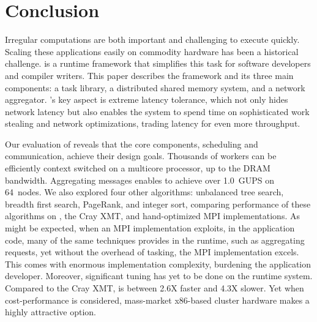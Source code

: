 \section{Conclusion}

Irregular computations are both important and challenging to execute
quickly.  Scaling these applications easily on commodity hardware has
been a historical challenge. \Grappa is a runtime framework that
simplifies this task for software developers and compiler
writers. This paper describes the \Grappa framework and its three main
components: a task library, a distributed shared memory system, and a
network aggregator. \Grappa's key aspect is extreme latency tolerance,
which not only hides network latency but also enables the system to
spend time on sophisticated work stealing and network optimizations,
trading latency for even more throughput.

Our evaluation of \Grappa reveals that the core components, scheduling
and communication, achieve their design goals.  Thousands of workers
can be efficiently context switched on a multicore processor, up to
the DRAM bandwidth.  Aggregating messages enables \Grappa to achieve
over 1.0~GUPS on 64~nodes.  We also explored four other algorithms:
unbalanced tree search, breadth first search, PageRank, and integer
sort, comparing performance of these algorithms on \Grappa, the Cray
XMT, and hand-optimized MPI implementations.  As might be expected,
when an MPI implementation exploits, in the application code, many of the
same techniques \Grappa provides in the runtime, such as aggregating
requests, yet without the overhead of tasking, the MPI implementation
excels.  This comes with enormous implementation complexity, burdening
the application developer. Moreover, significant tuning has yet to be
done on the \Grappa runtime system.  Compared to the Cray XMT, \Grappa
is between 2.6X faster and 4.3X slower.  Yet when cost-performance is
considered, mass-market x86-based cluster hardware makes \Grappa a
highly attractive option. 

